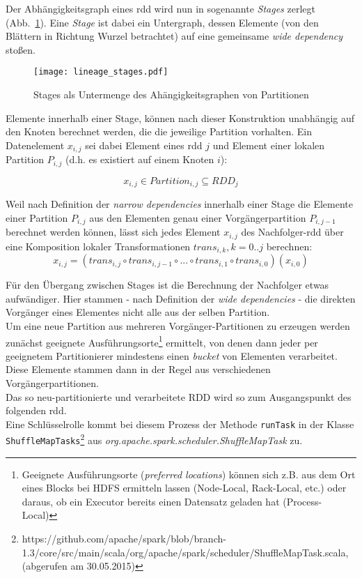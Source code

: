 Der Abhängigkeitsgraph eines \gls{rdd} wird nun in sogenannte \textit{Stages} zerlegt (Abb.~\ref{fig:lineage_stages}). Eine \textit{Stage} ist dabei ein Untergraph, dessen Elemente (von den Blättern in Richtung Wurzel betrachtet) auf eine gemeinsame \textit{wide dependency} stoßen.\\

\begin{figure}[ht!]
	\centering
  \texttt{[image: lineage\_stages.pdf]}
	\caption{Stages als Untermenge des Ahängigkeitsgraphen von Partitionen}
	\label{fig:lineage_stages}
\end{figure}

Elemente innerhalb einer Stage, können nach dieser Konstruktion unabhängig auf den Knoten berechnet werden, die die jeweilige Partition vorhalten. Ein Datenelement \(x_{i,j}\) sei dabei Element eines \gls{rdd} \(j\) und Element einer lokalen Partition \(P_{i,j}\) (d.h. es existiert auf einem Knoten \(i\)):

\[x_{i,j} \in Partition_{i,j} \subseteq RDD_j\]

Weil nach Definition der \textit{narrow dependencies} innerhalb einer Stage die Elemente einer Partition \(P_{i,j}\) aus den Elementen genau einer Vorgängerpartition \(P_{i,j-1}\) berechnet werden können, lässt sich jedes Element \(x_{i,j}\) des Nachfolger-\gls{rdd} über eine Komposition lokaler Transformationen \(trans_{i,k}, k = 0..j\) berechnen:\\ 

\[x_{i,j} = (trans_{i,j} \circ trans_{i,j-1} \circ ... \circ trans_{i,1}\circ trans_{i,0})(x_{i,0})\]

Für den Übergang zwischen Stages ist die Berechnung der Nachfolger etwas aufwändiger. Hier stammen - nach Definition der \textit{wide dependencies} - die direkten Vorgänger eines Elementes nicht alle aus der selben Partition.\\

Um eine neue Partition aus mehreren Vorgänger-Partitionen zu erzeugen werden zunächst geeignete Ausführungsorte\footnote{Geeignete Ausführungsorte (\textit{preferred locations}) können sich z.B. aus dem Ort eines Blocks bei HDFS ermitteln lassen (Node-Local, Rack-Local, etc.) oder daraus, ob ein Executor bereits einen Datensatz geladen hat (Process-Local)} ermittelt, von denen dann jeder per geeignetem Partitionierer mindestens einen \textit{bucket} von Elementen verarbeitet. Diese Elemente stammen dann in der Regel aus verschiedenen Vorgängerpartitionen.\\
Das so neu-partitionierte und verarbeitete \gls{RDD} wird so zum Ausgangspunkt des folgenden \gls{rdd}.\\
Eine Schlüsselrolle kommt bei diesem Prozess der Methode \lstinline|runTask| in der Klasse \lstinline|ShuffleMapTasks|\footnote{https://github.com/apache/spark/blob/branch-1.3/core/src/main/scala/org/apache/spark/scheduler/ShuffleMapTask.scala, (abgerufen am 30.05.2015)} aus \textit{org.apache.spark.scheduler.ShuffleMapTask} zu.\\

